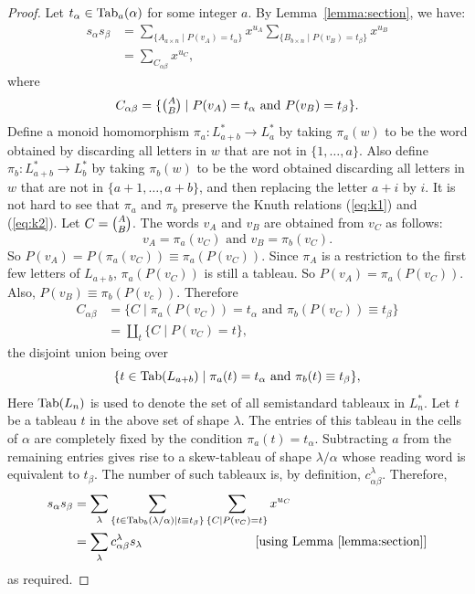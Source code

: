 \documentclass[11pt]{amsproc}
\theoremstyle{definition}
\theoremstyle{example}
\newcommand{\Tab}{\textup{Tab}}
\begin{document}
\begin{proof}
  Let $t_\alpha\in \Tab_a(\alpha)$ for some integer $a$.
  By Lemma~\ref{lemma:section}, we have:
  \begin{align}
    \nonumber s_\alpha s_\beta & = \sum_{\{A_{a\times n}\mid P(v_{A}) = t_\alpha\}} x^{u_{A}} \sum_{\{B_{b\times n}\mid P(v_B) = t_\beta\}} x^{u_{B}}\\
    \label{eq:sum-C} & = \sum_{C_{\alpha\beta}} x^{u_C},
  \end{align}
  where
  \begin{displaymath}
    C_{\alpha\beta} = \{\tbinom AB\mid P(v_A)=t_\alpha\text{ and } P(v_B)=t_\beta\}.
  \end{displaymath}
  Define a monoid homomorphism $\pi_a:L_{a+b}^*\to L^*_a$ by taking $\pi_a(w)$ to be the word obtained by discarding all letters in $w$ that are not in $\{1,\dotsc,a\}$.
  Also define $\pi_b:L_{a+b}^*\to L_b^*$ by taking $\pi_b(w)$ to be the word obtained discarding all letters in $w$ that are not in $\{a+1,\dotsc, a+b\}$, and then replacing the letter $a+i$ by $i$.
  It is not hard to see that $\pi_a$ and $\pi_b$ preserve the Knuth relations (\ref{eq:k1}) and (\ref{eq:k2}).
  Let $C=\tbinom AB$.
  The words $v_A$ and $v_B$ are obtained from $v_C$ as follows:
  \begin{displaymath}
    v_A = \pi_a(v_C) \text{ and } v_B = \pi_b(v_C).
  \end{displaymath}
  So $P(v_A) = P(\pi_a(v_C)) \equiv \pi_a(P(v_C))$.
  Since $\pi_A$ is a restriction to the first few letters of $L_{a+b}$, $\pi_a(P(v_C))$ is still a tableau.
  So $P(v_A) = \pi_a(P(v_C))$.
  Also, $P(v_B) \equiv \pi_b(P(v_c))$.
  Therefore
  \begin{align*}
    C_{\alpha\beta} & = \{C \mid \pi_a(P(v_C)) = t_\alpha \text{ and } \pi_b(P(v_C))\equiv  t_\beta\}\\
    & = \coprod_t \{C\mid P(v_C)=t\},
  \end{align*}
  the disjoint union being over
  \begin{displaymath}
    \{t\in \Tab(L_{a+b})\mid \pi_a(t)=t_\alpha \text{ and } \pi_b(t)\equiv t_\beta\},
  \end{displaymath}
  Here $\Tab(L_n)$ is used to denote the set of all semistandard tableaux in $L_n^*$.
  Let $t$ be a tableau $t$ in the above set of shape $\lambda$.
  The entries of this tableau in the cells of $\alpha$ are completely fixed by the condition $\pi_a(t)=t_\alpha$.
  Subtracting $a$ from the remaining entries gives rise to a skew-tableau of shape $\lambda/\alpha$ whose reading word is equivalent to $t_\beta$.
  The number of such tableaux is, by definition, $c^\lambda_{\alpha\beta}$. Therefore,
  \begin{align*}
    s_\alpha s_\beta &= \sum_\lambda \sum_{\{t\in \Tab_b(\lambda/\alpha)\mid t\equiv t_\beta\}} \sum_{\{C\mid P(v_C)=t\}} x^{u_C}\\
    &=\sum_\lambda c^\lambda_{\alpha\beta} s_\lambda \hspace{3cm}\text{ [using Lemma~\ref{lemma:section}]}
  \end{align*}
  as required.
\end{proof}
\end{document}
